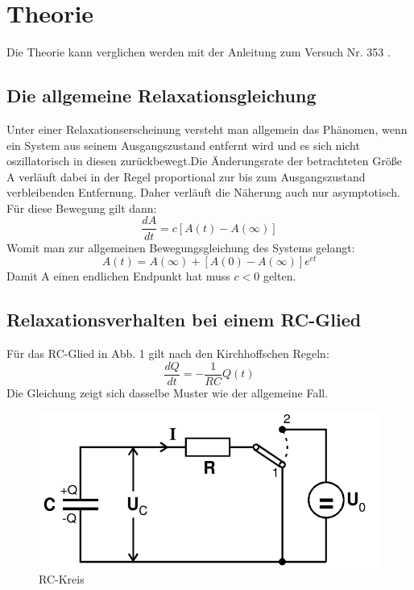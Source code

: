 \section{Theorie}
\label{sec:Theorie}
Die Theorie kann verglichen werden mit der Anleitung zum Versuch Nr. 353 \cite{V353}.
\subsection{Die allgemeine Relaxationsgleichung}
Unter einer Relaxationserscheinung versteht man allgemein das Phänomen, wenn
 ein System aus seinem Ausgangszustand entfernt wird und es sich nicht oszillatorisch
 in diesen zurückbewegt.Die Änderungsrate der betrachteten Größe A verläuft dabei
 in der Regel proportional zur bis zum Ausgangszustand verbleibenden Entfernung. Daher
  verläuft die Näherung auch nur asymptotisch. Für diese
 Bewegung gilt dann:
 \begin{equation}
   \frac{dA}{dt} = c[A(t)-A(\infty)]
 \end{equation}
Womit man zur allgemeinen Bewegungsgleichung des Systems gelangt:
\begin{equation}
  A(t) = A(\infty)+[A(0)-A(\infty)]e^{ct}
\end{equation}
Damit A einen endlichen Endpunkt hat muss $ c < 0$ gelten.

\subsection{Relaxationsverhalten bei einem RC-Glied}

Für das RC-Glied in Abb. 1 gilt nach den Kirchhoffschen Regeln:
\begin{equation}
  \frac{dQ}{dt} = -\frac{1}{RC}Q(t)
\end{equation}
Die Gleichung zeigt sich dasselbe Muster wie der allgemeine Fall.
\begin{figure}[H]
  \centering
  \includegraphics[width=\linewidth-200pt,height=\textheight-200pt,keepaspectratio]{content/RC_Kreis1.png}
  \caption{RC-Kreis}
  \label{fig:RC_Kreis1}
\end{figure}

